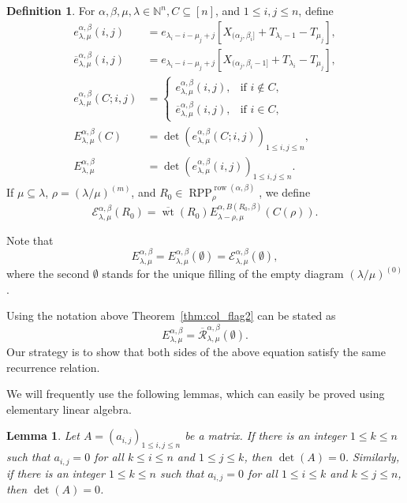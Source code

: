 \documentclass[12pt]{amsart}
\numberwithin{equation}{section}
\newtheorem{lem}[thm]{Lemma}
\theoremstyle{definition}
\newtheorem{defn}[thm]{Definition}
\newcommand\ove{\overline{e}}
\newcommand\row{\operatorname{row}}
\newcommand\NN{\mathbb{N}}
\newcommand\RPP{\operatorname{RPP}}
\newcommand\lm{{\lambda/\mu}}
\newcommand\wt{\operatorname{wt}}
\newcommand\R{\mathcal{R}}
\newcommand\oR{\overline{\R}}
\newcommand\EE{\mathcal{E}}
\newcommand\owt{\overline{\wt}}
\begin{document}
\begin{defn}\label{defn:E}
For $\alpha,\beta,\mu,\lambda\in\NN^n,C\subseteq[n]$, and $1\le i,j\le n$,
define
\begin{align*}
  e_{\lambda,\mu}^{\alpha,\beta}(i,j) &=
  e_{\lambda_i-i-\mu_j+j}[X_{(\alpha_j,\beta_i]}+T_{\lambda_i-1}-T_{\mu_j}],\\
  \ove_{\lambda,\mu}^{\alpha,\beta}(i,j) &=
  e_{\lambda_i-i-\mu_j+j}[X_{(\alpha_j,\beta_i-1]}+T_{\lambda_i}-T_{\mu_j}],\\
  e_{\lambda,\mu}^{\alpha,\beta}(C;i,j) &=
  \begin{cases}
   e_{\lambda,\mu}^{\alpha,\beta}(i,j), & \mbox{if $i\not\in C$},\\
   \ove_{\lambda,\mu}^{\alpha,\beta}(i,j), & \mbox{if $i\in C$},
  \end{cases}\\
  E_{\lambda,\mu}^{\alpha,\beta}(C) &=
  \det(e_{\lambda,\mu}^{\alpha,\beta}(C;i,j))_{1\le i,j\le n},\\
  E_{\lambda,\mu}^{\alpha,\beta} &=
  \det(e_{\lambda,\mu}^{\alpha,\beta}(i,j))_{1\le i,j\le n}.
\end{align*}
If $\mu\subseteq\lambda$, $\rho=(\lm)^{(m)}$, and
$R_0\in\RPP^{\row(\alpha,\beta)}_\rho$, we define
\begin{equation}
  \label{eq:defEE}
  \EE_{\lambda,\mu}^{\alpha,\beta}(R_0) = \owt(R_0)
  E_{\lambda-\rho,\mu}^{\alpha,B(R_0,\beta)}(C(\rho)).
\end{equation}
\end{defn}
Note that
\[
E_{\lambda,\mu}^{\alpha,\beta}=E_{\lambda,\mu}^{\alpha,\beta}(\emptyset)
=\EE_{\lambda,\mu}^{\alpha,\beta}(\emptyset),
\]
where the second $\emptyset$ stands for the unique filling of
the empty diagram $(\lm)^{(0)}$.

Using the notation above Theorem~\ref{thm:col_flag2} can be stated as
\[
E_{\lambda,\mu}^{\alpha,\beta} = \oR_{\lambda,\mu}^{\alpha,\beta}(\emptyset).
\]
Our strategy is to show that both sides of the above equation satisfy the same
recurrence relation.


We will frequently use the following lemmas, which can easily be proved using
elementary linear algebra.

\begin{lem}\label{lem:det=0}
  Let $A=(a_{i,j})_{1\le i,j\le n}$ be a matrix. If there is an integer $1\le
  k\le n$ such that $a_{i,j}=0$ for all $k\le i\le n$ and $1\le j\le k$, then
  $\det(A)=0$. Similarly, if there is an integer $1\le k\le n$ such that
  $a_{i,j}=0$ for all $1\le i\le k$ and $k\le j\le n$, then $\det(A)=0$.
\end{lem}
\end{document}
